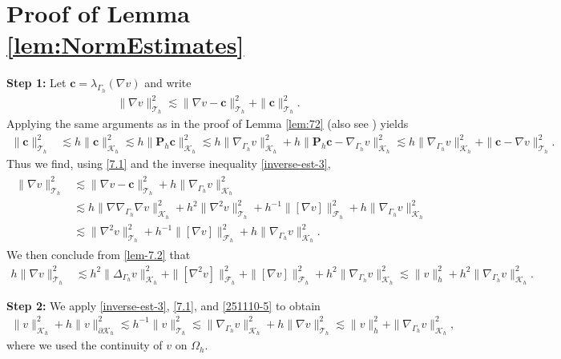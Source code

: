 \documentclass[10pt, a4paper]{amsart}
\newcommand{\p}{\partial}
\newcommand{\nab}{\nabla}
\newcommand{\calT}{\mathcal{T}}
\newcommand{\calF}{\mathcal{F}}
\newcommand{\calK}{\mathcal{K}}
\newcommand{\Grad}{\nabla\!\!\!\!\nabla}
\theoremstyle{definition}
\theoremstyle{remark}
\theoremstyle{example}
\numberwithin{equation}{section}
\begin{document}



\appendix

\section{Proof of Lemma \ref{lem:NormEstimates}}\label{sec:ProofOfNormEstimates}

{\bf Step 1:}
Let ${\bm c} = \lambda_{\Gamma_h}(\nab v)$ and write
\begin{align*}
\|\nab v\|_{\calT_h}^2\lesssim \|\nab v - {\bm c}\|_{\calT_h}^2 +\|{\bm c}\|_{\calT_h}^2.
\end{align*}
Applying the same arguments as
in the proof of Lemma \ref{lem:72} (also see \cite[Lemma 5.3]{burman2017cut}) yields
\begin{align*}
\|{\bm c}\|_{\calT_h}^2 
&\lesssim h \|{\bm c}\|_{\calK_h}^2\lesssim h \|{\bm P_h}{\bm c}\|_{\calK_h}^2
\lesssim h\|\nab_{\Gamma_h} v\|_{\calK_h}^2 + h\|{\bm P_h}{\bm c}-\nab_{\Gamma_h}v\|_{\calK_h}^2
\lesssim h\|\nab_{\Gamma_h} v\|_{\calK_h}^2 + \|{\bm c}-\nab v\|_{\calT_h}^2.
\end{align*}
%
Thus we find, using \eqref{7.1} and the inverse inequality \eqref{inverse-est-3},
\begin{align}
\begin{split} \label{251110-7}
\|\nab v\|_{\calT_h}^2
& \lesssim \|\nab v-{\bm c}\|_{\calT_h}^2 + h \|\nab_{\Gamma_h} v\|_{\calK_h}^2 \\
& \lesssim h \|\Grad_{\Gamma_h} \nab v\|_{\calK_h}^2 + h^2 \|\nab^2 v\|_{\calT_h}^2 + h^{-1}\|[\nab v]\|_{\calF_h}^2+ h \|\nab_{\Gamma_h} v\|_{\calK_h}^2 \\
%
& \lesssim \|\nab^2 v\|_{\calT_h}^2 + h^{-1}\|[\nab v]\|_{\calF_h}^2+ h \|\nab_{\Gamma_h} v\|_{\calK_h}^2.
\end{split}
\end{align}
%
We then conclude from \eqref{lem-7.2} that
 \begin{align}
h\|\nab v\|_{\calT_h}^2
 & \lesssim h^2 \|\Delta_{\Gamma_h} v\|_{\calK_h}^2 + \|[\nab^2 v]\|_{\calF_h}^2+ 
 \|[\nab v]\|_{\calF_h}^2+ h^2 \|\nab_{\Gamma_h} v\|_{\calK_h}^2
 \lesssim \|v\|_{h}^2 + h^2 \|\nab_{\Gamma_h} v\|_{\calK_h}^2.
 \label{251110-5}
 \end{align}

{\bf Step 2:}
We apply \eqref{inverse-est-3}, \eqref{7.1}, and \eqref{251110-5} to obtain
\begin{align*}
\|v\|_{\calK_h}^2 + h\|v\|_{\p \calK_h}^2
\lesssim h^{-1}\|v\|_{\calT_h}^2
\lesssim \|\nab_{\Gamma_h}v\|_{\calK_h}^2 + h\|\nab v\|_{\calT_h}^2\lesssim \|v\|_h^2 +  \|\nab_{\Gamma_h}v\|_{\calK_h}^2,
\end{align*}
where we used the continuity of $v$ on $\Omega_h$.
\end{document}
